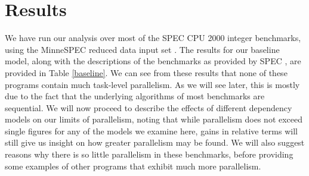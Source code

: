 \section{Results} \label{sresults}

We have run our analysis over most of the SPEC CPU 2000 integer benchmarks, using the MinneSPEC reduced data input set \cite{KleinOsowski02minnespec}.
The results for our baseline model, along with the descriptions of the benchmarks as provided by SPEC \cite{henning00spec}, are provided in Table \ref{baseline}.
We can see from these results that none of these programs contain much task-level parallelism.
As we will see later, this is mostly due to the fact that the underlying algorithms of most benchmarks are sequential.
We will now proceed to describe the effects of different dependency models on our limits of parallelism, noting that while parallelism does not exceed single figures for any of the models we examine here, gains in relative terms will still give us insight on how greater parallelism may be found.
We will also suggest reasons why there is so little parallelism in these benchmarks, before providing some examples of other programs that exhibit much more parallelism.

